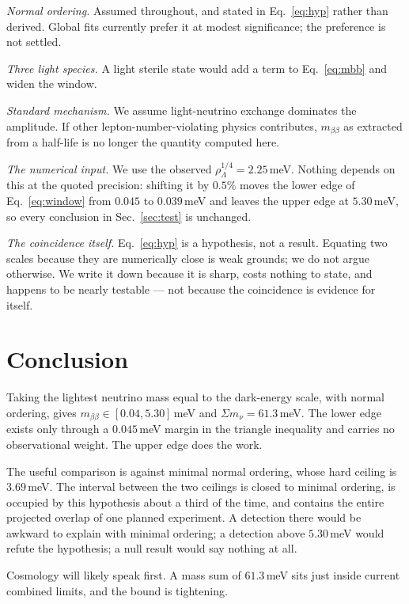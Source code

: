 \documentclass[aps,prd,twocolumn,superscriptaddress,nofootinbib,10pt]{revtex4-2}
\begin{document}
\emph{Normal ordering.} Assumed throughout, and stated in Eq.~\eqref{eq:hyp} rather than derived.
Global fits currently prefer it at modest significance; the preference is not settled.

\emph{Three light species.} A light sterile state would add a term to Eq.~\eqref{eq:mbb} and widen
the window.

\emph{Standard mechanism.} We assume light-neutrino exchange dominates the amplitude. If other
lepton-number-violating physics contributes, $m_{\beta\beta}$ as extracted from a half-life is no
longer the quantity computed here.

\emph{The numerical input.} We use the observed $\rho_\Lambda^{1/4} = 2.25\,$meV. Nothing depends
on this at the quoted precision: shifting it by $0.5\%$ moves the lower edge of
Eq.~\eqref{eq:window} from $0.045$ to $0.039\,$meV and leaves the upper edge at $5.30\,$meV, so
every conclusion in Sec.~\ref{sec:test} is unchanged.

\emph{The coincidence itself.} Eq.~\eqref{eq:hyp} is a hypothesis, not a result. Equating two
scales because they are numerically close is weak grounds; we do not argue otherwise. We write it
down because it is sharp, costs nothing to state, and happens to be nearly testable --- not because
the coincidence is evidence for itself.

\section{Conclusion}

Taking the lightest neutrino mass equal to the dark-energy scale, with normal ordering, gives
$m_{\beta\beta} \in [0.04, 5.30]\,$meV and $\Sigma m_\nu = 61.3\,$meV. The lower edge exists only
through a $0.045\,$meV margin in the triangle inequality and carries no observational weight. The
upper edge does the work.

The useful comparison is against minimal normal ordering, whose hard ceiling is $3.69\,$meV. The
interval between the two ceilings is closed to minimal ordering, is occupied by this hypothesis
about a third of the time, and contains the entire projected overlap of one planned experiment. A
detection there would be awkward to explain with minimal ordering; a detection above $5.30\,$meV
would refute the hypothesis; a null result would say nothing at all.

Cosmology will likely speak first. A mass sum of $61.3\,$meV sits just inside current combined
limits, and the bound is tightening.



\end{document}
